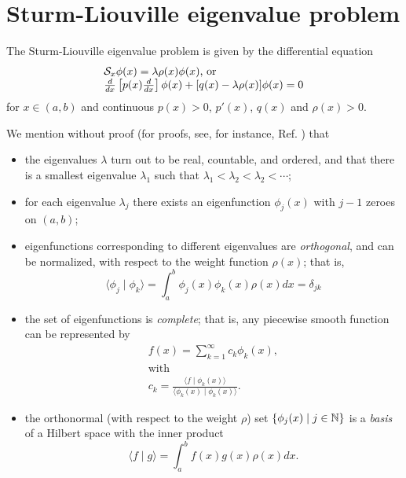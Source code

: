 \section{Sturm-Liouville eigenvalue problem}

The Sturm-Liouville eigenvalue problem is given by the differential equation
\begin{equation}
\begin{array}  {l}
{\cal S}_{x}    \phi (x) = \lambda \rho  (x) \phi (x)\textrm{, or } \\
\frac{d}{dx}
\left[
p(x)
\frac{d}{dx}
\right] \phi(x)
+
[q(x)   -  \lambda \rho  (x) ]\phi(x)=0
\end{array}
\label{2011-m-ch-slee}
\end{equation}
for $x\in(a,b)$ and continuous $p(x)>0$, $p'(x)$, $q(x)$ and $\rho  (x)>0$.

We mention without proof (for proofs, see, for instance, Ref. \cite{Al-Gwaiz}) that
\begin{itemize}
\item
the eigenvalues $\lambda$ turn out to be real, countable, and ordered, and that there is a smallest eigenvalue $\lambda_1$
such that $\lambda_1<\lambda_2<\lambda_2< \cdots$;

\item
for each eigenvalue $\lambda_j$ there exists an eigenfunction
$\phi_j(x)$ with $j-1$ zeroes on $(a,b)$;

\item
eigenfunctions corresponding to different eigenvalues are {\em orthogonal}, and can be normalized, with respect
to the weight function $\rho  (x)$; that is,
\begin{equation}
\langle \phi_j \mid \phi_k \rangle
=
\int_a^b
\phi_j (x)\phi_k(x)
\rho  (x)         dx
= \delta_{jk}
\label{2011-m-ch-slonef}
\end{equation}

\item
the set of eigenfunctions   is {\em complete}; that is, any piecewise smooth function can be represented by
\begin{equation}
\begin{array}  {l}
f(x)=\sum_{k=1}^\infty c_k\phi_k(x), \\
\textrm{with }     \\
c_k=\frac{ \langle f \mid \phi_k(x)\rangle }  { \langle \phi_k(x) \mid \phi_k(x)\rangle }.
\end{array}
\label{2011-m-ch-sleecom}
\end{equation}

\item
the orthonormal (with respect to the weight $\rho $) set $\{\phi_j(x)\mid j\in {\Bbb N}\}$
is a {\em basis} of a Hilbert space with the inner product
\begin{equation}
\langle f \mid g\rangle
=
\int_a^b
f (x) g(x)
\rho  (x)         dx
.
\label{2011-m-ch-slspbtf}
\end{equation}

\end{itemize}

